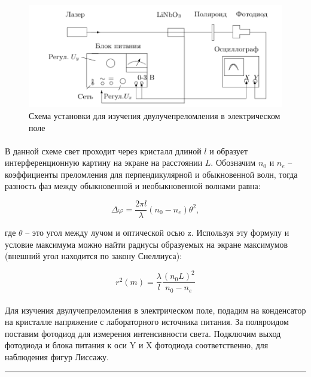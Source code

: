 \documentclass[a4paper,12pt]{article} %
\begin{document}
\begin{figure}[h]
\centering
\includegraphics[width=\textwidth]{setup2.png}
\caption{Схема установки для изучения двулучепреломления в электрическом поле}
\label{fig:setup2}
\end{figure}

\paragraph{} В данной схеме свет проходит через кристалл длиной $l$ и образует интерференционную картину на экране на расстоянии $L$. Обозначим $n_0$ и $n_e$ -- коэффициенты преломления для перпендикулярной и обыкновенной волн, тогда разность фаз между обыкновенной и необыкновенной волнами равна:

\begin{equation}
\Delta \varphi = \frac{2 \pi l}{\lambda} (n_0 - n_e) \theta^2,
\label{e:deltaphi}
\end{equation}

\noindent где $\theta$ -- это угол между лучом и оптической осью z. Используя эту формулу и условие максимума можно найти радиусы образуемых на экране максимумов (внешний угол находится по закону Снеллиуса):

\begin{equation}
r^2(m) = \frac{\lambda}{l} \frac{(n_0 L)^2}{n_0 - n_e}
\label{e:rad}
\end{equation}

\paragraph{} Для изучения двулучепреломления в электрическом поле, подадим на конденсатор на кристалле напряжение с лабораторного источника питания. За поляроидом поставим фотодиод для измерения интенсивности света. Подключим выход фотодиода и блока питания к оси Y и X фотодиода соответственно, для наблюдения фигур Лиссажу. 

\medskip\hrule\medskip
\end{document}
